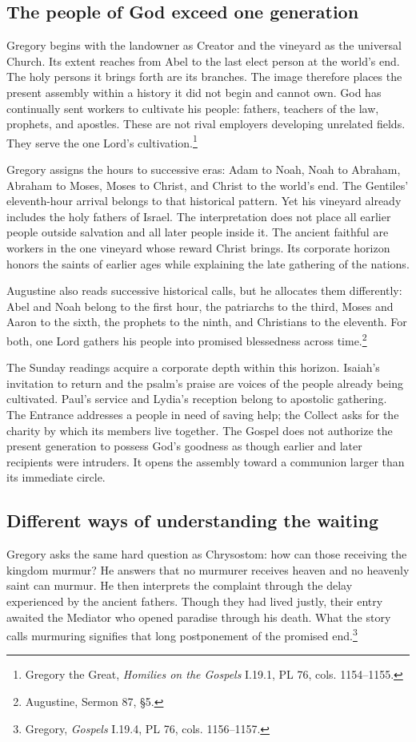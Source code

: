 \subsection{The people of God exceed one generation}
Gregory begins with the landowner as Creator and the vineyard as the universal Church. Its extent reaches from Abel to the last elect person at the world's end. The holy persons it brings forth are its branches. The image therefore places the present assembly within a history it did not begin and cannot own. God has continually sent workers to cultivate his people: fathers, teachers of the law, prophets, and apostles. These are not rival employers developing unrelated fields. They serve the one Lord's cultivation.\footnote{Gregory the Great, \textit{Homilies on the Gospels} I.19.1, PL 76, cols. 1154--1155.}

Gregory assigns the hours to successive eras: Adam to Noah, Noah to Abraham, Abraham to Moses, Moses to Christ, and Christ to the world's end. The Gentiles' eleventh-hour arrival belongs to that historical pattern. Yet his vineyard already includes the holy fathers of Israel. The interpretation does not place all earlier people outside salvation and all later people inside it. The ancient faithful are workers in the one vineyard whose reward Christ brings. Its corporate horizon honors the saints of earlier ages while explaining the late gathering of the nations.

Augustine also reads successive historical calls, but he allocates them differently: Abel and Noah belong to the first hour, the patriarchs to the third, Moses and Aaron to the sixth, the prophets to the ninth, and Christians to the eleventh. For both, one Lord gathers his people into promised blessedness across time.\footnote{Augustine, Sermon 87, §5.}

The Sunday readings acquire a corporate depth within this horizon. Isaiah's invitation to return and the psalm's praise are voices of the people already being cultivated. Paul's service and Lydia's reception belong to apostolic gathering. The Entrance addresses a people in need of saving help; the Collect asks for the charity by which its members live together. The Gospel does not authorize the present generation to possess God's goodness as though earlier and later recipients were intruders. It opens the assembly toward a communion larger than its immediate circle.

\subsection{Different ways of understanding the waiting}
Gregory asks the same hard question as Chrysostom: how can those receiving the kingdom murmur? He answers that no murmurer receives heaven and no heavenly saint can murmur. He then interprets the complaint through the delay experienced by the ancient fathers. Though they had lived justly, their entry awaited the Mediator who opened paradise through his death. What the story calls murmuring signifies that long postponement of the promised end.\footnote{Gregory, \textit{Gospels} I.19.4, PL 76, cols. 1156--1157.}

